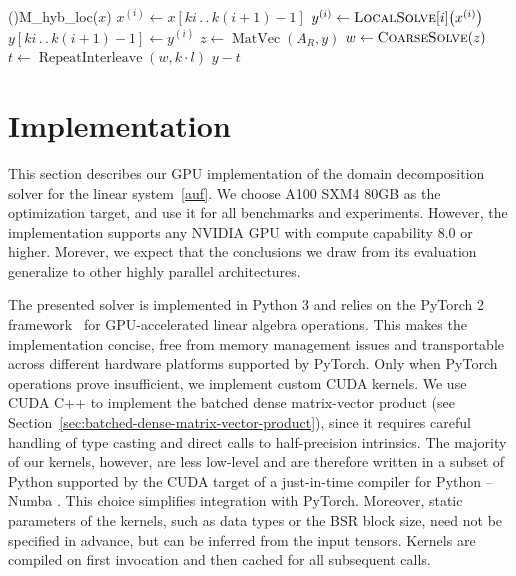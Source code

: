 \documentclass[11pt]{article}
\newcommand{\Call}[2]{\operatorname{#1}\!\left(#2\right)}
\newcommand*{\slice}{\ensuremath{\, . \, . \,}}
\theoremstyle{definition}
\theoremstyle{theorem}
\begin{document}
\begin{algorithm}
  \caption{Hybrid Schwarz Preconditioner -- Multiplication By a Vector}
  \label{preconditioner-M-hyb-pseudocode}
  \KwReq{$k$, $l$, $\bar l$, \textsc{CoarseSolve}, \textsc{LocalSolve}$[0\slice N_H-1]$, $A_R$}

  \Function(){M\_hyb\_loc($x$)} {
     {
      $x^{(i)}\gets x[ki \slice k(i + 1)-1]$  
      $y^{(i)}\gets \textsc{LocalSolve}[i]\!\left(x^{(i)}\right)$  
      $y[ki \slice k(i + 1) - 1] \gets y^{(i)}$  
    }
    $z \gets \Call{MatVec}{A_R, y}$  
    $w \gets \textsc{CoarseSolve}\!\left(z\right)$  
    $t \gets \Call{RepeatInterleave}{w, k\cdot l}$  
    \Return $y - t$
  }
\end{algorithm}
\section{Implementation}
\label{chap:implementation}

This section describes our GPU implementation of the domain decomposition
solver for the linear system~\eqref{auf}. We choose A100 SXM4 80GB as
the optimization target, and use it for all benchmarks and experiments.
However, the implementation supports any NVIDIA GPU with compute capability
8.0 or higher. Morever, we expect that the conclusions we draw from its
evaluation generalize to other highly parallel architectures.

The presented solver is implemented in Python 3 and relies on the PyTorch 2
framework~\cite{pytorch,pytorch2} for GPU-accelerated linear algebra operations.
This makes the implementation concise, free from memory management issues
and transportable across different hardware platforms supported by PyTorch.
Only when PyTorch operations prove insufficient, we implement custom CUDA kernels.
We use CUDA C++ \cite[Chapter 3]{cuda-guide} to
implement the batched dense matrix\nobreakdash-vector product
(see Section~\ref{sec:batched-dense-matrix-vector-product}),
since it requires careful handling of type casting and direct calls to
half-precision intrinsics. The majority of our kernels, however, are less low-level
and are therefore written in a subset of Python supported by the CUDA target
of a just-in-time compiler for Python -- Numba \cite{numba}.
This choice simplifies integration with PyTorch.
Moreover, static parameters of the kernels, such as data types or the BSR block size,
need not be specified in advance, but can be inferred from the input tensors.
Kernels are compiled on first invocation and then cached for all subsequent calls.
\end{document}
